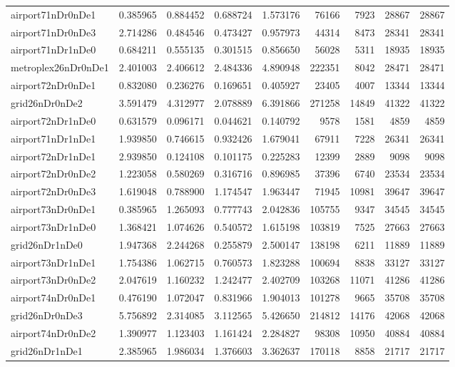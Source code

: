 \begin{longtable}{|l|r|r|r|r|r|r|r|r|}
airport71nDr0nDe1 & 0.385965 & 0.884452 & 0.688724 & 1.573176 & 76166 & 7923 & 28867 & 28867 \\
airport71nDr0nDe3 & 2.714286 & 0.484546 & 0.473427 & 0.957973 & 44314 & 8473 & 28341 & 28341 \\
airport71nDr1nDe0 & 0.684211 & 0.555135 & 0.301515 & 0.856650 & 56028 & 5311 & 18935 & 18935 \\
metroplex26nDr0nDe1 & 2.401003 & 2.406612 & 2.484336 & 4.890948 & 222351 & 8042 & 28471 & 28471 \\
airport72nDr0nDe1 & 0.832080 & 0.236276 & 0.169651 & 0.405927 & 23405 & 4007 & 13344 & 13344 \\
grid26nDr0nDe2 & 3.591479 & 4.312977 & 2.078889 & 6.391866 & 271258 & 14849 & 41322 & 41322 \\
airport72nDr1nDe0 & 0.631579 & 0.096171 & 0.044621 & 0.140792 & 9578 & 1581 & 4859 & 4859 \\
airport71nDr1nDe1 & 1.939850 & 0.746615 & 0.932426 & 1.679041 & 67911 & 7228 & 26341 & 26341 \\
airport72nDr1nDe1 & 2.939850 & 0.124108 & 0.101175 & 0.225283 & 12399 & 2889 & 9098 & 9098 \\
airport72nDr0nDe2 & 1.223058 & 0.580269 & 0.316716 & 0.896985 & 37396 & 6740 & 23534 & 23534 \\
airport72nDr0nDe3 & 1.619048 & 0.788900 & 1.174547 & 1.963447 & 71945 & 10981 & 39647 & 39647 \\
airport73nDr0nDe1 & 0.385965 & 1.265093 & 0.777743 & 2.042836 & 105755 & 9347 & 34545 & 34545 \\
airport73nDr1nDe0 & 1.368421 & 1.074626 & 0.540572 & 1.615198 & 103819 & 7525 & 27663 & 27663 \\
grid26nDr1nDe0 & 1.947368 & 2.244268 & 0.255879 & 2.500147 & 138198 & 6211 & 11889 & 11889 \\
airport73nDr1nDe1 & 1.754386 & 1.062715 & 0.760573 & 1.823288 & 100694 & 8838 & 33127 & 33127 \\
airport73nDr0nDe2 & 2.047619 & 1.160232 & 1.242477 & 2.402709 & 103268 & 11071 & 41286 & 41286 \\
airport74nDr0nDe1 & 0.476190 & 1.072047 & 0.831966 & 1.904013 & 101278 & 9665 & 35708 & 35708 \\
grid26nDr0nDe3 & 5.756892 & 2.314085 & 3.112565 & 5.426650 & 214812 & 14176 & 42068 & 42068 \\
airport74nDr0nDe2 & 1.390977 & 1.123403 & 1.161424 & 2.284827 & 98308 & 10950 & 40884 & 40884 \\
grid26nDr1nDe1 & 2.385965 & 1.986034 & 1.376603 & 3.362637 & 170118 & 8858 & 21717 & 21717 \\

\end{longtable}
